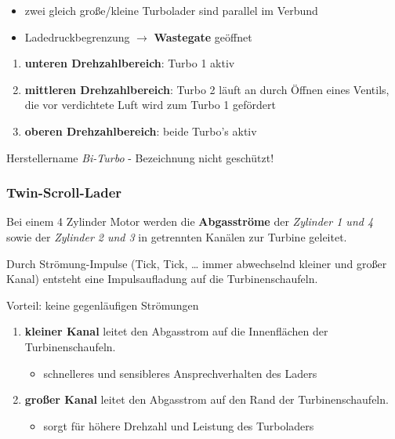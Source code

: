 \begin{itemize}
\item
  zwei gleich große/kleine Turbolader sind parallel im Verbund
\item
  Ladedruckbegrenzung $\to$ \textbf{Wastegate} geöffnet
\end{itemize}

\begin{enumerate}
\item
  \textbf{unteren Drehzahlbereich}: Turbo 1 aktiv
\item
  \textbf{mittleren Drehzahlbereich}: Turbo 2 läuft an durch Öffnen
  eines Ventils, die vor verdichtete Luft wird zum Turbo 1 gefördert
\item
  \textbf{oberen Drehzahlbereich}: beide Turbo's aktiv
\end{enumerate}

Herstellername \emph{Bi-Turbo} - Bezeichnung nicht geschützt!

\subsubsection{Twin-Scroll-Lader}\label{twin-scroll-lader}

Bei einem 4 Zylinder Motor werden die \textbf{Abgasströme} der
\emph{Zylinder 1 und 4} sowie der \emph{Zylinder 2 und 3} in getrennten
Kanälen zur Turbine geleitet.

Durch Strömung-Impulse (Tick, Tick, \ldots{} immer abwechselnd kleiner
und großer Kanal) entsteht eine Impulsaufladung auf die
Turbinenschaufeln.

Vorteil: keine gegenläufigen Strömungen

\begin{enumerate}
\item
  \textbf{kleiner Kanal} leitet den Abgasstrom auf die Innenflächen der
  Turbinenschaufeln.

  \begin{itemize}
  \item
    schnelleres und sensibleres Ansprechverhalten des Laders
  \end{itemize}
\item
  \textbf{großer Kanal} leitet den Abgasstrom auf den Rand der
  Turbinenschaufeln.

  \begin{itemize}
  \item
    sorgt für höhere Drehzahl und Leistung des Turboladers
  \end{itemize}
\end{enumerate}

